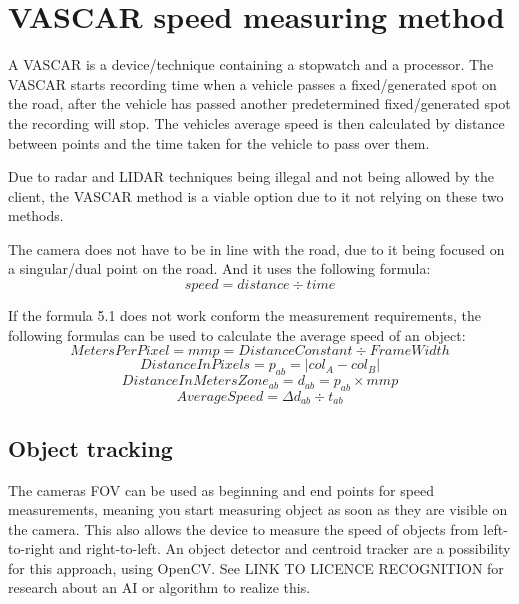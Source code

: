 \section{VASCAR speed measuring method}
A VASCAR is a device/technique containing a stopwatch and a processor. The VASCAR starts recording time when a vehicle passes a fixed/generated spot 
on the road, after the vehicle has passed another predetermined fixed/generated spot the recording will stop. The vehicles average speed is then calculated 
by distance between points and the time taken for the vehicle to pass over them. 

Due to radar and LIDAR techniques being illegal and not being allowed by the client, the VASCAR method is a viable option due to it not relying on 
these two methods.

The camera does not have to be in line with the road, due to it being focused on a singular/dual point on the road. And it uses the following formula:
\begin{equation}
    speed = distance \div time
\end{equation}


If the formula 5.1 does not work conform the measurement requirements, the following formulas can be used to calculate the average speed of an object:
\begin{equation}
    Meters Per Pixel = mmp = Distance Constant \div Frame Width
\end{equation}
\begin{equation}
    Distance In Pixels = p_{ab} = | col_A - col_B |
\end{equation}
\begin{equation}
    Distance In Meters Zone_{ab} = d_{ab} = p_{ab} \times mmp
\end{equation}
\begin{equation}
    Average Speed = \Delta d_{ab} \div t_{ab}
\end{equation}

\subsection{Object tracking}
The cameras FOV can be used as beginning and end points for speed measurements, meaning you start measuring object as soon as they are visible on the 
camera. This also allows the device to measure the speed of objects from left-to-right and right-to-left. An object detector and centroid tracker are 
a possibility for this approach, using OpenCV. See LINK TO LICENCE RECOGNITION for research about an AI or algorithm to realize this.

